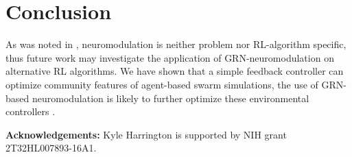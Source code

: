 \section{Conclusion}


As was noted in \cite{Schweighofer2003}, neuromodulation is neither problem nor RL-algorithm specific, thus future work may investigate the application of GRN-neuromodulation on alternative RL algorithms. We have shown that a simple feedback controller can optimize community features of agent-based swarm simulations, the use of GRN-based neuromodulation is likely to further optimize these environmental controllers \cite{Gold2014}.

\textbf{Acknowledgements:} Kyle Harrington is supported by NIH grant 2T32HL007893-16A1.
